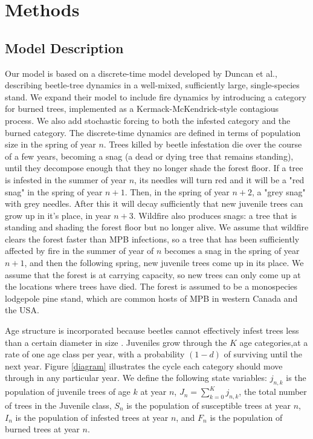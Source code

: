 \section{Methods}

\subsection{Model Description}

Our model is based on a discrete-time model developed by Duncan et al.\cite{duncan2015model}, describing beetle-tree dynamics in a well-mixed, sufficiently large, single-species stand. We expand their model to include fire dynamics by introducing a category for burned trees, implemented as a Kermack-McKendrick-style contagious process\cite{edelstein1988mathematical}. We also add stochastic forcing to both the infested category and the burned category. The discrete-time dynamics are defined in terms of population size in the spring of year $n$. Trees killed by beetle infestation die over the course of a few years, becoming a snag (a dead or dying tree that remains standing), until they decompose enough that they no longer shade the forest floor. If a tree is infested in the summer of year $n$, its needles will turn red and it will be a "red snag" in the spring of year $n+1$. Then, in the spring of year $n+2$, a "grey snag" with grey needles. After this it will decay sufficiently that new juvenile trees can grow up in it's place, in year $n+3$. Wildfire also produces snags: a tree that is standing and shading the forest floor but no longer alive. We assume that wildfire clears the forest faster than MPB infections, so a tree that has been sufficiently affected by fire in the summer of year of $n$ becomes a snag in the spring of year $n+1$, and then the following spring, new juvenile trees come up in its place. We assume that the forest is at carrying capacity, so new trees can only come up at the locations where trees have died. The forest is assumed to be a monospecies lodgepole pine stand, which are common hosts of MPB in western Canada and the USA.


Age structure is incorporated because beetles cannot effectively infest trees less than a certain diameter in size \cite{safranyik2003mountain, alfaro2003dendroecological}. Juveniles grow through the $K$ age categories,at a rate of one age class per year, with a  probability $(1-d)$ of surviving until the next year. Figure \ref{diagram} illustrates the cycle each category should move through in any particular year.  We define the following state variables: $j_{n,k}$ is the population of juvenile trees of age $k$ at year $n$, $J_n = \sum_{k = 0}^{K} j_{n,k}$, the total number of trees in the Juvenile class, $S_n$ is the population of susceptible trees at year $n$, $I_n$ is the population of infested trees at year $n$, and $F_n$ is the population of burned trees at year $n$.

